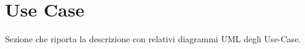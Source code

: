 \section{Use Case}

Sezione che riporta la descrizione con relativi diagrammi UML degli Use-Case.












